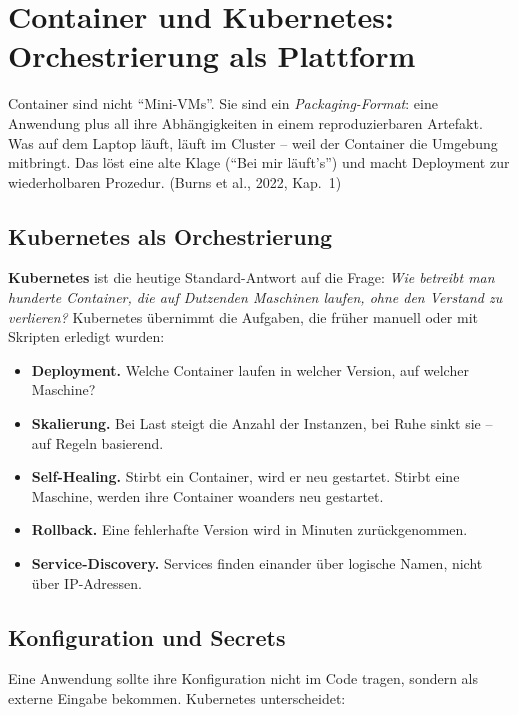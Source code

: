 \documentclass[11pt,a4paper,oneside]{article}
\newcommand{\fachbegriff}[1]{\textbf{#1}}
\newcommand{\quelle}[1]{{\footnotesize\color{lpGray}(#1)}}
\begin{document}
\section{Container und Kubernetes: Orchestrierung als Plattform}

Container sind nicht ``Mini-VMs''. Sie sind ein \emph{Packaging-Format}: eine Anwendung plus all ihre Abhängigkeiten in einem reproduzierbaren Artefakt. Was auf dem Laptop läuft, läuft im Cluster -- weil der Container die Umgebung mitbringt. Das löst eine alte Klage (``Bei mir läuft's'') und macht Deployment zur wiederholbaren Prozedur. \quelle{Burns et al., 2022, Kap.~1}

\subsection{Kubernetes als Orchestrierung}

\fachbegriff{Kubernetes} ist die heutige Standard-Antwort auf die Frage: \emph{Wie betreibt man hunderte Container, die auf Dutzenden Maschinen laufen, ohne den Verstand zu verlieren?} Kubernetes übernimmt die Aufgaben, die früher manuell oder mit Skripten erledigt wurden:

\begin{itemize}
  \item \fachbegriff{Deployment.} Welche Container laufen in welcher Version, auf welcher Maschine?
  \item \fachbegriff{Skalierung.} Bei Last steigt die Anzahl der Instanzen, bei Ruhe sinkt sie -- auf Regeln basierend.
  \item \fachbegriff{Self-Healing.} Stirbt ein Container, wird er neu gestartet. Stirbt eine Maschine, werden ihre Container woanders neu gestartet.
  \item \fachbegriff{Rollback.} Eine fehlerhafte Version wird in Minuten zurückgenommen.
  \item \fachbegriff{Service-Discovery.} Services finden einander über logische Namen, nicht über IP-Adressen.
\end{itemize}

\subsection{Konfiguration und Secrets}

Eine Anwendung sollte ihre Konfiguration nicht im Code tragen, sondern als externe Eingabe bekommen. Kubernetes unterscheidet:
\end{document}
